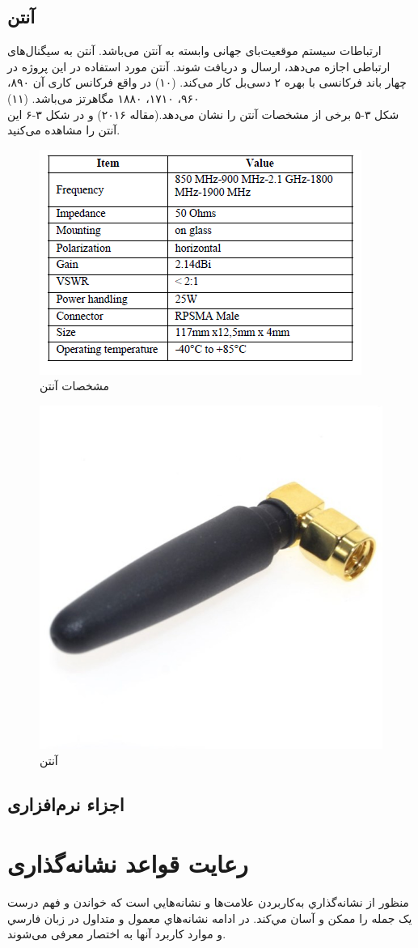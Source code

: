 \subsection{آنتن }
ارتباطات سیستم موقعیت‌بای جهانی وابسته به آنتن می‌باشد. آنتن به سیگنال‌های ارتباطی اجازه می‌دهد، ارسال و دریافت شوند. آنتن مورد استفاده در این پروژه در چهار باند فرکانسی با بهره ۲ دسی‌بل کار می‌کند. (۱۰) در واقع فرکانس کاری آن ۸۹۰، ۹۶۰، ۱۷۱۰، ۱۸۸۰ مگاهرتز می‌باشد. (۱۱)
\\
شکل ۳-۵ برخی از مشخصات آنتن را نشان می‌دهد.(مقاله ۲۰۱۶) و در شکل ۳-۶ این آنتن را مشاهده می‌کنید.
\begin{figure}[!h]
	\centerline{\includegraphics[width=.6\textwidth]{table1}}
	\caption{مشخصات آنتن }
\end{figure}
\begin{figure}[!h]
	\centerline{\includegraphics[width=.3\textwidth]{GSM-antenna}}
	\caption{آنتن }
\end{figure}

\subsection{اجزاء نرم‌افزاری}

\section{رعایت قواعد نشانه‌گذاری}
منظور از نشانه‌گذاري به‌کار‌بردن علامت‌ها و نشانه‌هايي است که خواندن و فهم درست یک جمله را ممکن و آسان مي‌کند. در ادامه نشانه‌هاي معمول و متداول در زبان فارسي و موارد کاربرد آنها به اختصار معرفی می‌شوند.

